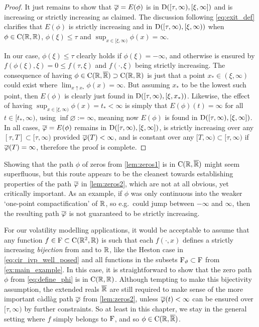 \begin{proof}
    It just remains to show that $\overline{\varphi}=E(\phi)$ is in $\mathrm{D}([\tau,\infty),[\xi,\infty])$ and is increasing or strictly increasing as claimed. The discussion following \autoref{eq:exit_def} clarifies that $E(\phi)$ is strictly increasing and in $\mathrm{D}([\tau,\infty),[\xi,\infty))$ when $\phi\in\mathrm{C}(\mathbb{R},\mathbb{R})$, $\phi(\xi)\le\tau$ and $\sup_{x\in[\xi,\infty)}\phi(x)=\infty$.

    In our case, $\phi(\xi)\le\tau$ clearly holds if $\phi(\xi)=-\infty$, and otherwise is ensured by $f(\phi(\xi),\xi)=0\le f(\tau,\xi)$ and $f(\cdot,\xi)$ being strictly increasing. The consequence of having $\phi\in\mathrm{C}(\mathbb{R},{\overline{\mathbb{R}}})\supset\mathrm{C}(\mathbb{R},\mathbb{R})$ is just that a point $x_*\in(\xi,\infty)$ could exist where $\lim_{x\uparrow x_*}\phi(x)=\infty$. But assuming $x_*$ to be the lowest such point, then $E(\phi)$ is clearly just found in $\mathrm{D}([\tau,\infty),[\xi,x_*))$. Likewise, the effect of having $\sup_{x\in[\xi,\infty)}\phi(x)=t_*<\infty$ is simply that $E(\phi)(t)=\infty$ for all $t\in[t_*,\infty)$, using $\inf\varnothing:=\infty$, meaning now $E(\phi)$ is found in $\mathrm{D}([\tau,\infty),[\xi,\infty])$. In all cases, $\overline{\varphi}=E(\phi)$ remains in $\mathrm{D}([\tau,\infty),[\xi,\infty])$, is strictly increasing over any $[\tau,T]\subset[\tau,\infty)$ provided $\overline{\varphi}(T)<\infty$, and is constant over any $[T,\infty)\subset[\tau,\infty)$ if $\overline{\varphi}(T)=\infty$, therefore the proof is complete.
\end{proof}

Showing that the path $\phi$ of zeros from \autoref{lem:zeros1} is in $\mathrm{C}(\mathbb{R},{\overline{\mathbb{R}}})$ might seem superfluous, but this route appears to be the cleanest towards establishing properties of the path $\overline{\varphi}$ in \autoref{lem:zeros2}, which are not at all obvious, yet critically important. As an example, if $\phi$ was only continuous into the weaker `one-point compactification' of $\mathbb{R}$, so e.g.~could jump between $-\infty$ and $\infty$, then the resulting path $\overline{\varphi}$ is not guaranteed to be strictly increasing.

For our volatility modelling applications, it would be acceptable to assume that any function $f\in\mathrm{F}\subset\mathrm{C}(\mathbb{R}^2,\mathbb{R})$ is such that each $f(\cdot,x)$ defines a strictly increasing \emph{bijection} from and to $\mathbb{R}$, like the Heston case in \autoref{eq:cir_ivp_well_posed} and all functions in the subsets $\mathrm{F}_\vartheta\subset\mathrm{F}$ from \autoref{ex:main_example}. In this case, it is straightforward to show that the zero path $\phi$ from \autoref{eq:define_phi} is in $\mathrm{C}(\mathbb{R},\mathbb{R})$. Although tempting to make this bijectivity assumption, the extended reals ${\overline{\mathbb{R}}}$ are still required to make sense of the more important c\`adl\`ag path $\overline{\varphi}$ from \autoref{lem:zeros2}, unless $\overline{\varphi}(t)<\infty$ can be ensured over $[\tau,\infty)$ by further constraints. So at least in this chapter, we stay in the general setting where $f$ simply belongs to $\mathrm{F}$, and so $\phi\in\mathrm{C}(\mathbb{R},{\overline{\mathbb{R}}})$.

